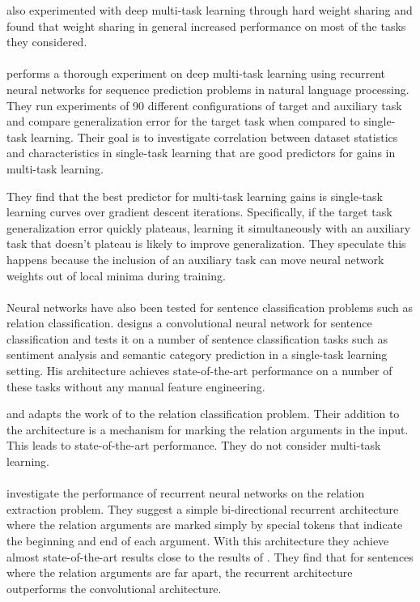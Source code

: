\citet{collobert2011} also experimented with deep multi-task learning through hard weight sharing and found that weight sharing in general increased performance on most of the tasks they considered.
\\\\
\citet{bingel2017} performs a thorough experiment on deep multi-task learning using recurrent neural networks for sequence prediction problems in natural language processing. They run experiments of 90 different configurations of target and auxiliary task and compare generalization error for the target task when compared to single-task learning. Their goal is to investigate correlation between dataset statistics and characteristics in single-task learning that are good predictors for gains in multi-task learning.

They find that the best predictor for multi-task learning gains is single-task learning curves over gradient descent iterations. Specifically, if the target task generalization error quickly plateaus, learning it simultaneously with an auxiliary task that doesn't plateau is likely to improve generalization. They speculate this happens because the inclusion of an auxiliary task can move neural network weights out of local minima during training.
\\\\
Neural networks have also been tested for sentence classification problems such as relation classification. \citet{kim2014} designs a convolutional neural network for sentence classification and tests it on a number of sentence classification tasks such as sentiment analysis and semantic category prediction in a single-task learning setting. His architecture achieves state-of-the-art performance on a number of these tasks without any manual feature engineering.

\citet{nguyen2015} and adapts the work of \citet{kim2014} to the relation classification problem. Their addition to the architecture is a mechanism for marking the relation arguments in the input. This leads to state-of-the-art performance. They do not consider multi-task learning.
\\\\
\citet{zhang2015} investigate the performance of recurrent neural networks on the relation extraction problem. They suggest a simple bi-directional recurrent architecture where the relation arguments are marked simply by special tokens that indicate the beginning and end of each argument. With this architecture they achieve almost state-of-the-art results close to the results of \citet{nguyen2015}. They find that for sentences where the relation arguments are far apart, the recurrent architecture outperforms the convolutional architecture.